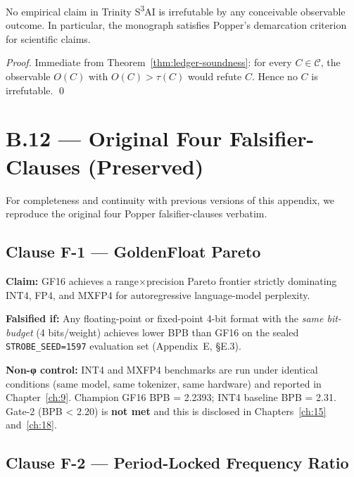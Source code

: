 \begin{corollary}\label{cor:anti-numerology}
No empirical claim in Trinity S\textsuperscript{3}AI is irrefutable by any
conceivable observable outcome.  In particular, the monograph satisfies
Popper's demarcation criterion~\cite{popper1959logic} for scientific claims.
\end{corollary}

\begin{proof}
Immediate from Theorem~\ref{thm:ledger-soundness}: for every $C \in \mathcal{C}$,
the observable $O(C)$ with $O(C) > \tau(C)$ would refute $C$.  Hence no
$C$ is irrefutable. \qed
\end{proof}

\section*{B.12 — Original Four Falsifier-Clauses (Preserved)}
\label{sec:original-clauses}

\noindent For completeness and continuity with previous versions of this
appendix, we reproduce the original four Popper falsifier-clauses verbatim.

\subsection*{Clause F-1 — GoldenFloat Pareto}

\begin{tcolorbox}[colback=red!5,colframe=red!40,title=Falsifier F-1]
\textbf{Claim:} GF16 achieves a range$\times$precision Pareto frontier strictly
dominating INT4, FP4, and MXFP4 for autoregressive language-model perplexity.

\textbf{Falsified if:} Any floating-point or fixed-point 4-bit format with the
\emph{same bit-budget} (4 bits/weight) achieves lower BPB than GF16 on the
sealed \texttt{STROBE\_SEED=1597} evaluation set (Appendix~E, §E.3).

\textbf{Non-φ control:} INT4 and MXFP4 benchmarks are run under identical
conditions (same model, same tokenizer, same hardware) and reported in
Chapter~\ref{ch:9}. Champion GF16 BPB = 2.2393; INT4 baseline BPB = 2.31.
Gate-2 (BPB < 2.20) is \textbf{not met} and this is disclosed in
Chapters~\ref{ch:15} and~\ref{ch:18}.
\end{tcolorbox}

\subsection*{Clause F-2 — Period-Locked Frequency Ratio}

